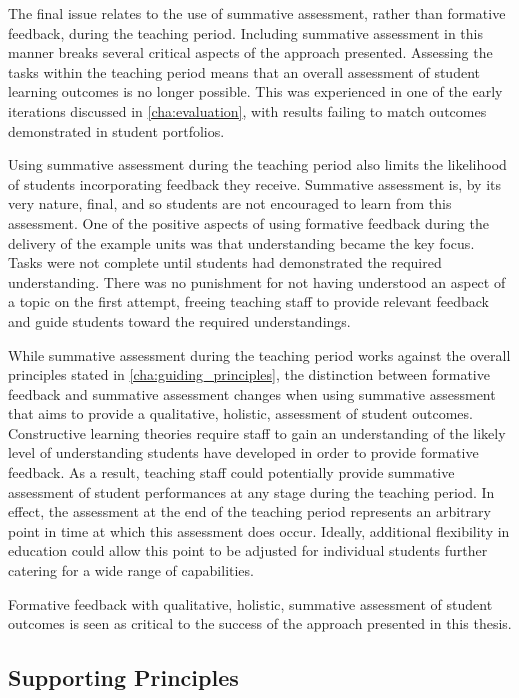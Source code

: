 The final issue relates to the use of summative assessment, rather than formative feedback, during the teaching period. Including summative assessment in this manner breaks several critical aspects of the approach presented. Assessing the tasks within the teaching period means that an overall assessment of student learning outcomes is no longer possible. This was experienced in one of the early iterations discussed in \cref{cha:evaluation}, with results failing to match outcomes demonstrated in student portfolios.

Using summative assessment during the teaching period also limits the likelihood of students incorporating feedback they receive. Summative assessment is, by its very nature, final, and so students are not encouraged to learn from this assessment. One of the positive aspects of using formative feedback during the delivery of the example units was that understanding became the key focus. Tasks were not complete until students had demonstrated the required understanding. There was no punishment for not having understood an aspect of a topic on the first attempt, freeing teaching staff to provide relevant feedback and guide students toward the required understandings.

While summative assessment during the teaching period works against the overall principles stated in \cref{cha:guiding_principles}, the distinction between formative feedback and summative assessment changes when using summative assessment that aims to provide a qualitative, holistic, assessment of student outcomes. Constructive learning theories require staff to gain an understanding of the likely level of understanding students have developed in order to provide formative feedback. As a result, teaching staff could potentially provide summative assessment of student performances at any stage during the teaching period. In effect, the assessment at the end of the teaching period represents an arbitrary point in time at which this assessment does occur. Ideally, additional flexibility in education could allow this point to be adjusted for individual students further catering for a wide range of capabilities.

Formative feedback with qualitative, holistic, summative assessment of student outcomes is seen as critical to the success of the approach presented in this thesis.


\subsection{Supporting Principles} %
\label{sub:supporting_principles}

